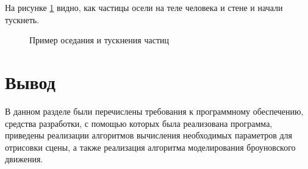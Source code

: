 На рисунке \ref{fig:virus_settled} видно, как частицы осели на теле человека и стене и начали тускнеть.

\begin{figure}[ph!]
	\caption{Пример оседания и тускнения частиц}
	\label{fig:virus_settled}
\end{figure}

\section*{Вывод}
В данном разделе были перечислены требования к программному обеспечению, средства разработки, с помощью которых была реализована программа, приведены реализации алгоритмов вычисления необходимых параметров для отрисовки сцены, а также реализация алгоритма моделирования броуновского движения.


